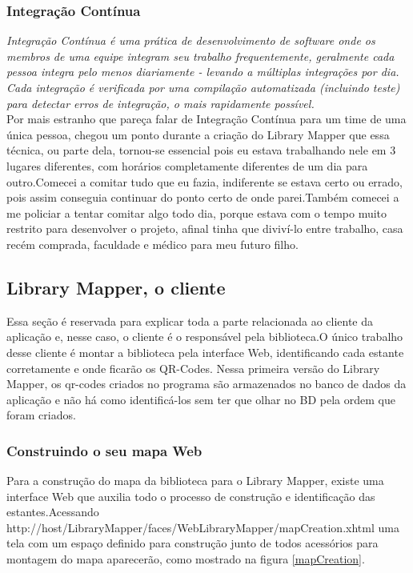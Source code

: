\documentclass[a4paper,10pt]{article}
\begin{document}
	\subsubsection{Integração Contínua}
	{\it	Integração Contínua é uma prática de desenvolvimento de software onde os membros de uma equipe integram seu trabalho frequentemente, geralmente cada pessoa integra pelo menos diariamente - levando a múltiplas integrações por dia. Cada integração é verificada por uma compilação automatizada (incluindo teste) para detectar erros de integração, o mais rapidamente possível.}\cite{ic}\\

	Por mais estranho que pareça falar de Integração Contínua para um time de uma única pessoa, chegou um ponto durante a criação do Library Mapper que essa técnica, ou parte dela, tornou-se essencial pois eu estava trabalhando nele em 3 lugares diferentes, com horários completamente diferentes de um dia para outro.Comecei a comitar tudo que eu fazia, indiferente se estava certo ou errado, pois assim conseguia continuar do ponto certo de onde parei.Também comecei a me policiar a tentar comitar algo todo dia, porque estava com o tempo muito restrito para desenvolver o projeto, afinal tinha que diviví-lo entre trabalho, casa recém comprada, faculdade e médico para meu futuro filho. 	   
   \subsection{Library Mapper, o cliente}
	Essa seção é reservada para explicar toda a parte relacionada ao cliente da aplicação e, nesse caso, o cliente é o responsável pela biblioteca.O único trabalho desse cliente é montar a biblioteca pela interface Web, identificando cada estante corretamente e onde ficarão os QR-Codes.
	Nessa primeira versão do Library Mapper, os qr-codes criados no programa são armazenados no banco de dados da aplicação e não há como identificá-los sem ter que olhar no BD pela ordem que foram criados.
	\subsubsection{Construindo o seu mapa Web} 
	
		Para a construção do mapa da biblioteca para o Library Mapper, existe uma interface Web que auxilia todo o processo de construção e identificação das estantes.Acessando http://host/LibraryMapper/faces/WebLibraryMapper/mapCreation.xhtml uma tela com um espaço definido para construção junto de todos acessórios para montagem do mapa aparecerão, como mostrado na figura  \ref{mapCreation}.\\
\end{document}
